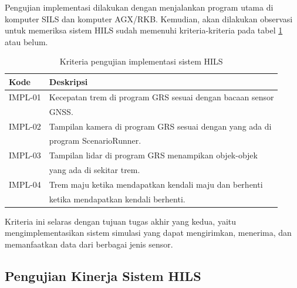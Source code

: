 Pengujian implementasi dilakukan dengan menjalankan program utama di komputer
SILS dan komputer AGX/RKB. Kemudian, akan dilakukan observasi untuk memeriksa
sistem HILS sudah memenuhi kriteria-kriteria pada tabel
\ref{chapter-4-tbl-impl-criteria} atau belum.
\begin{table}[!htbp]
	\begin{center}
		\begin{tabular}{|l|l|}
			\hline
			\textbf{Kode} & \textbf{Deskripsi}                                     \\
			\hline
			IMPL-01       & Kecepatan trem di program GRS sesuai dengan bacaan
			sensor                                                                 \\
			              & GNSS.                                                  \\
			\hline
			IMPL-02       & Tampilan kamera di program GRS sesuai dengan yang
			ada di                                                                 \\
			              & program ScenarioRunner.                                \\
			\hline
			IMPL-03       & Tampilan lidar di program GRS menampikan
			objek-objek                                                            \\
			              & yang ada di sekitar trem.                              \\
			\hline
			IMPL-04       & Trem maju ketika mendapatkan kendali maju dan berhenti \\
			              & ketika mendapatkan kendali berhenti.                   \\
			\hline
		\end{tabular}
	\end{center}

	\caption{Kriteria pengujian implementasi sistem HILS}
	\label{chapter-4-tbl-impl-criteria}
\end{table}

Kriteria ini selaras dengan tujuan tugas akhir yang kedua, yaitu
mengimplementasikan sistem simulasi yang dapat mengirimkan, menerima, dan
memanfaatkan data dari berbagai jenis sensor.

\subsection{Pengujian Kinerja Sistem HILS}

